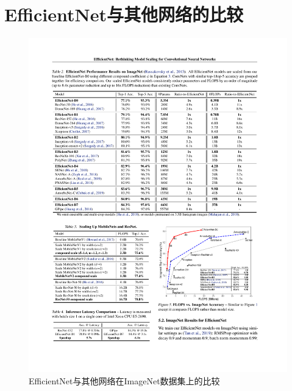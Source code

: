 \documentclass[12pt, a4paper, oneside]{ctexart}
\numberwithin{equation}{section}  %
\begin{document}
\section{EfficientNet与其他网络的比较}
\begin{figure}[htbp]
  \hspace*{-2cm}
  \centering
  \includegraphics[scale=1.15]{EfficientNet.pdf}
  \caption{EfficientNet与其他网络在ImageNet数据集上的比较}
  \label{fig-compare}
\end{figure}
\end{document}
